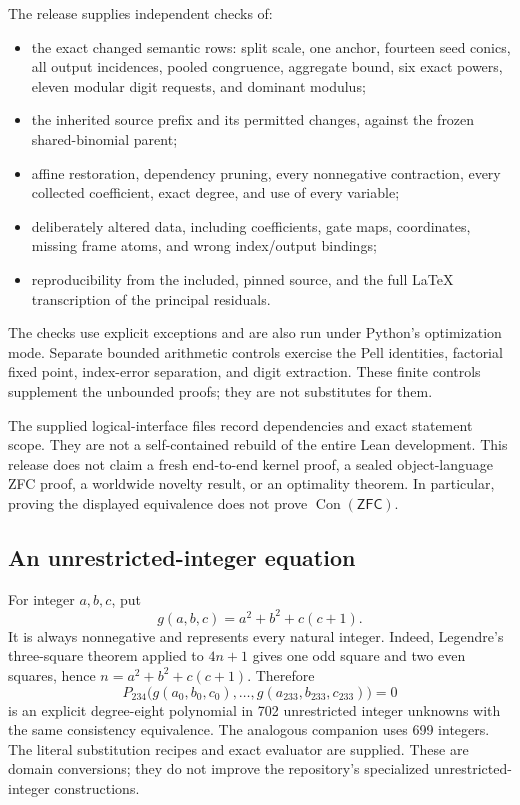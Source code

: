 \documentclass[11pt,a4paper]{article}
\theoremstyle{remark}
\newcommand{\Con}{\operatorname{Con}}
\newcommand{\ZFC}{\mathsf{ZFC}}
\begin{document}
The release supplies independent checks of:
\begin{itemize}[leftmargin=*]
\item the exact changed semantic rows: split scale, one anchor, fourteen
seed conics, all output incidences, pooled congruence, aggregate bound,
six exact powers, eleven modular digit requests, and dominant modulus;
\item the inherited source prefix and its permitted changes, against the
frozen shared-binomial parent;
\item affine restoration, dependency pruning, every nonnegative contraction,
every collected coefficient, exact degree, and use of every variable;
\item deliberately altered data, including coefficients, gate maps,
coordinates, missing frame atoms, and wrong index/output bindings;
\item reproducibility from the included, pinned source, and the full
LaTeX transcription of the principal residuals.
\end{itemize}
The checks use explicit exceptions and are also run under Python's
optimization mode. Separate bounded arithmetic controls exercise the
Pell identities, factorial fixed point, index-error separation, and digit
extraction. These finite controls supplement the unbounded proofs; they
are not substitutes for them.

The supplied logical-interface files record dependencies and exact statement
scope. They are not a self-contained rebuild of the entire Lean development.
This release does not claim a fresh end-to-end kernel proof, a sealed
object-language ZFC proof, a worldwide novelty result, or an optimality
theorem. In particular, proving the displayed equivalence does not prove
\(\Con(\ZFC)\).

\subsection{An unrestricted-integer equation}

For integer \(a,b,c\), put
\[
 g(a,b,c)=a^2+b^2+c(c+1).
\]
It is always nonnegative and represents every natural integer. Indeed,
Legendre's three-square theorem applied to \(4n+1\) gives one odd square
and two even squares, hence \(n=a^2+b^2+c(c+1)\).
Therefore
\[
 P_{234}\bigl(g(a_0,b_0,c_0),\ldots,g(a_{233},b_{233},c_{233})\bigr)=0
\]
is an explicit degree-eight polynomial in 702 unrestricted integer
unknowns with the same consistency equivalence. The analogous companion
uses 699 integers. The literal substitution recipes and exact evaluator
are supplied. These are domain conversions; they do not improve the
repository's specialized unrestricted-integer constructions.
\end{document}
